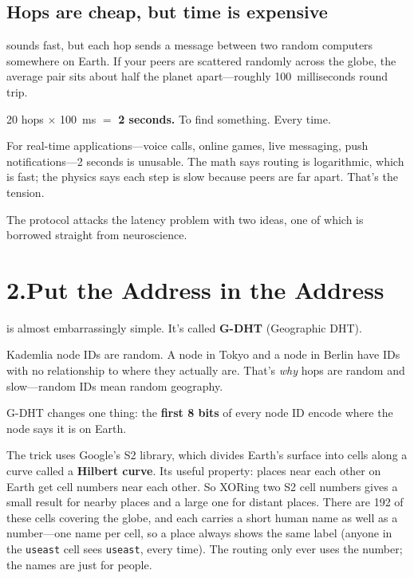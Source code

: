 \documentclass[nobib,justified]{tufte-handout}
\begin{document}
\subsection{Hops are cheap, but time is expensive}

 sounds fast, but each hop sends a message between two random computers somewhere on Earth. If your peers are scattered randomly across the globe, the average pair sits about half the planet apart---roughly 100~milliseconds round trip.

20 hops $\times$ 100~ms $=$ \textbf{2 seconds.} To find something. Every time.

For real-time applications---voice calls, online games, live messaging, push notifications---2 seconds is unusable. The math says routing is logarithmic, which is fast; the physics says each step is slow because peers are far apart. That's the tension.

The protocol attacks the latency problem with two ideas, one of which is borrowed straight from neuroscience.

\section{2.\quad Put the Address in the Address}

 is almost embarrassingly simple. It's called \textbf{G-DHT} (Geographic DHT).

Kademlia node IDs are random. A node in Tokyo and a node in Berlin have IDs with no relationship to where they actually are. That's \emph{why} hops are random and slow---random IDs mean random geography.

G-DHT changes one thing: the \textbf{first 8 bits} of every node ID encode where the node says it is on Earth.

The trick uses Google's S2 library, which divides Earth's surface into cells along a curve called a \textbf{Hilbert curve}. Its useful property: places near each other on Earth get cell numbers near each other. So XORing two S2 cell numbers gives a small result for nearby places and a large one for distant places. There are 192 of these cells covering the globe, and each carries a short human name as well as a number---one name per cell, so a place always shows the same label (anyone in the \texttt{useast} cell sees \texttt{useast}, every time). The routing only ever uses the number; the names are just for people.
\end{document}
